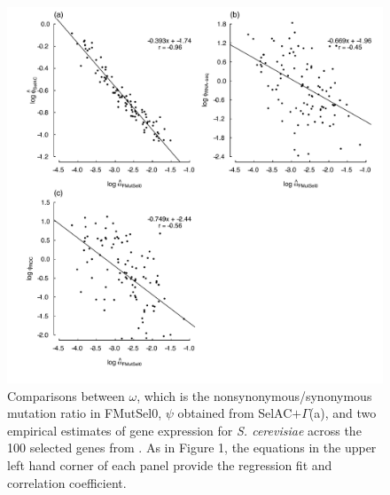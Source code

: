 \documentclass{article}
\newcommand{\selacplusgamma}{SelAC$+\Gamma$\xspace}
\begin{document}
\begin{figure}[H]
  \centering
  \includegraphics[width=0.9\linewidth]{FIGURE_2_MutSelOmega_vs_Us_ROC_Scer_only.pdf}
  \caption{Comparisons between $\omega$, which is the nonsynonymous/synonymous mutation ratio in FMutSel0, $\psi$ obtained from \selacplusgamma (a), and two empirical estimates of gene expression for \emph{S. cerevisiae} across the 100 selected genes from \citet{SalichosAndRokas2013}.  
    As in Figure 1, the equations in the upper left hand corner of each panel provide the regression fit and correlation coefficient.
  } 
  \label{fig:OmegavsPsi}
\end{figure}
\end{document}

